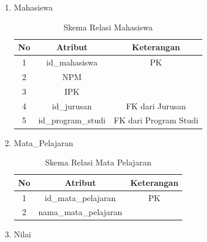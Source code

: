 \begin{enumerate}
    \item Mahasiswa
        
        \begin{table}[H]
            \centering
            \begin{tabular}{|c|c|c|}
                \hline
                No & Atribut & Keterangan \\
                \hline
                1 & id\_mahasiswa & PK \\
                \hline
                2 & NPM & \\
                \hline
                3 & IPK & \\
                \hline
                4 & id\_jurusan & FK dari Jurusan\\
                \hline
                5 & id\_program\_studi & FK dari Program Studi \\
                \hline
            \end{tabular}
            \caption{Skema Relasi Mahasiswa}
            \label{tab:skema relasi mahasiswa}
        \end{table}
        
    \item Mata\_Pelajaran
        
        \begin{table}[H]
            \centering
            \begin{tabular}{|c|c|c|}
                \hline
                No & Atribut & Keterangan \\
                \hline
                1 & id\_mata\_pelajaran & PK \\
                \hline
                2 & nama\_mata\_pelajaran & \\
                \hline
            \end{tabular}
            \caption{Skema Relasi Mata Pelajaran}
            \label{tab:skema relasi mata pelajaran}
        \end{table}
        
    \item Nilai
    

\end{enumerate}
